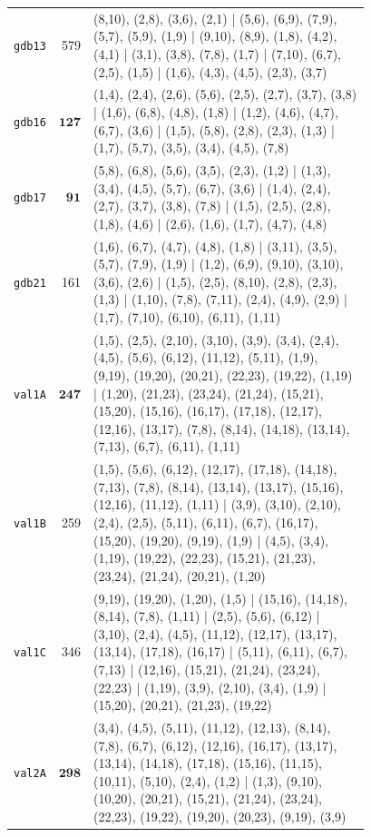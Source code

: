 \begin{landscape}
\begin{longtable}{lr>{\tiny\raggedright\arraybackslash}p{0.78\linewidth}}
\texttt{gdb13} & 579 & (8,10), (2,8), (3,6), (2,1) | (5,6), (6,9), (7,9), (5,7), (5,9), (1,9) | (9,10), (8,9), (1,8), (4,2), (4,1) | (3,1), (3,8), (7,8), (1,7) | (7,10), (6,7), (2,5), (1,5) | (1,6), (4,3), (4,5), (2,3), (3,7) \\[2pt]
\texttt{gdb16} & $\mathbf{127}$ & (1,4), (2,4), (2,6), (5,6), (2,5), (2,7), (3,7), (3,8) | (1,6), (6,8), (4,8), (1,8) | (1,2), (4,6), (4,7), (6,7), (3,6) | (1,5), (5,8), (2,8), (2,3), (1,3) | (1,7), (5,7), (3,5), (3,4), (4,5), (7,8) \\[2pt]
\texttt{gdb17} & $\mathbf{91}$ & (5,8), (6,8), (5,6), (3,5), (2,3), (1,2) | (1,3), (3,4), (4,5), (5,7), (6,7), (3,6) | (1,4), (2,4), (2,7), (3,7), (3,8), (7,8) | (1,5), (2,5), (2,8), (1,8), (4,6) | (2,6), (1,6), (1,7), (4,7), (4,8) \\[2pt]
\texttt{gdb21} & 161 & (1,6), (6,7), (4,7), (4,8), (1,8) | (3,11), (3,5), (5,7), (7,9), (1,9) | (1,2), (6,9), (9,10), (3,10), (3,6), (2,6) | (1,5), (2,5), (8,10), (2,8), (2,3), (1,3) | (1,10), (7,8), (7,11), (2,4), (4,9), (2,9) | (1,7), (7,10), (6,10), (6,11), (1,11) \\[2pt]
\texttt{val1A} & $\mathbf{247}$ & (1,5), (2,5), (2,10), (3,10), (3,9), (3,4), (2,4), (4,5), (5,6), (6,12), (11,12), (5,11), (1,9), (9,19), (19,20), (20,21), (22,23), (19,22), (1,19) | (1,20), (21,23), (23,24), (21,24), (15,21), (15,20), (15,16), (16,17), (17,18), (12,17), (12,16), (13,17), (7,8), (8,14), (14,18), (13,14), (7,13), (6,7), (6,11), (1,11) \\[2pt]
\texttt{val1B} & 259 & (1,5), (5,6), (6,12), (12,17), (17,18), (14,18), (7,13), (7,8), (8,14), (13,14), (13,17), (15,16), (12,16), (11,12), (1,11) | (3,9), (3,10), (2,10), (2,4), (2,5), (5,11), (6,11), (6,7), (16,17), (15,20), (19,20), (9,19), (1,9) | (4,5), (3,4), (1,19), (19,22), (22,23), (15,21), (21,23), (23,24), (21,24), (20,21), (1,20) \\[2pt]
\texttt{val1C} & 346 & (9,19), (19,20), (1,20), (1,5) | (15,16), (14,18), (8,14), (7,8), (1,11) | (2,5), (5,6), (6,12) | (3,10), (2,4), (4,5), (11,12), (12,17), (13,17), (13,14), (17,18), (16,17) | (5,11), (6,11), (6,7), (7,13) | (12,16), (15,21), (21,24), (23,24), (22,23) | (1,19), (3,9), (2,10), (3,4), (1,9) | (15,20), (20,21), (21,23), (19,22) \\[2pt]
\texttt{val2A} & $\mathbf{298}$ & (3,4), (4,5), (5,11), (11,12), (12,13), (8,14), (7,8), (6,7), (6,12), (12,16), (16,17), (13,17), (13,14), (14,18), (17,18), (15,16), (11,15), (10,11), (5,10), (2,4), (1,2) | (1,3), (9,10), (10,20), (20,21), (15,21), (21,24), (23,24), (22,23), (19,22), (19,20), (20,23), (9,19), (3,9) \\[2pt]

\end{longtable}
\end{landscape}
